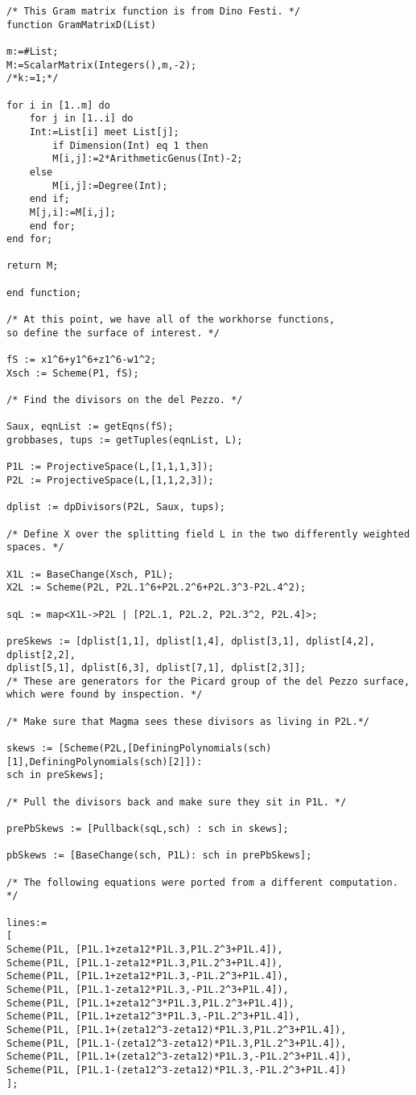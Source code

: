\documentclass[12pt,twoside]{reedthesis}
\theoremstyle{plain}
\theoremstyle{definition}
\theoremstyle{remark}
\begin{document}
\begin{appendices}
\begin{verbatim}
/* This Gram matrix function is from Dino Festi. */
function GramMatrixD(List)

m:=#List;
M:=ScalarMatrix(Integers(),m,-2);
/*k:=1;*/

for i in [1..m] do
    for j in [1..i] do
	Int:=List[i] meet List[j];
        if Dimension(Int) eq 1 then
	    M[i,j]:=2*ArithmeticGenus(Int)-2;
	else
	    M[i,j]:=Degree(Int);
	end if;
	M[j,i]:=M[i,j];
    end for;
end for;

return M;

end function;

/* At this point, we have all of the workhorse functions, 
so define the surface of interest. */

fS := x1^6+y1^6+z1^6-w1^2;
Xsch := Scheme(P1, fS);

/* Find the divisors on the del Pezzo. */

Saux, eqnList := getEqns(fS);
grobbases, tups := getTuples(eqnList, L);

P1L := ProjectiveSpace(L,[1,1,1,3]);
P2L := ProjectiveSpace(L,[1,1,2,3]);

dplist := dpDivisors(P2L, Saux, tups);

/* Define X over the splitting field L in the two differently weighted spaces. */

X1L := BaseChange(Xsch, P1L);
X2L := Scheme(P2L, P2L.1^6+P2L.2^6+P2L.3^3-P2L.4^2);

sqL := map<X1L->P2L | [P2L.1, P2L.2, P2L.3^2, P2L.4]>;

preSkews := [dplist[1,1], dplist[1,4], dplist[3,1], dplist[4,2], dplist[2,2], 
dplist[5,1], dplist[6,3], dplist[7,1], dplist[2,3]]; 
/* These are generators for the Picard group of the del Pezzo surface, 
which were found by inspection. */

/* Make sure that Magma sees these divisors as living in P2L.*/

skews := [Scheme(P2L,[DefiningPolynomials(sch)[1],DefiningPolynomials(sch)[2]]): 
sch in preSkews];

/* Pull the divisors back and make sure they sit in P1L. */

prePbSkews := [Pullback(sqL,sch) : sch in skews];

pbSkews := [BaseChange(sch, P1L): sch in prePbSkews];

/* The following equations were ported from a different computation. */

lines:=
[
Scheme(P1L, [P1L.1+zeta12*P1L.3,P1L.2^3+P1L.4]),
Scheme(P1L, [P1L.1-zeta12*P1L.3,P1L.2^3+P1L.4]),
Scheme(P1L, [P1L.1+zeta12*P1L.3,-P1L.2^3+P1L.4]),
Scheme(P1L, [P1L.1-zeta12*P1L.3,-P1L.2^3+P1L.4]),
Scheme(P1L, [P1L.1+zeta12^3*P1L.3,P1L.2^3+P1L.4]),
Scheme(P1L, [P1L.1+zeta12^3*P1L.3,-P1L.2^3+P1L.4]),
Scheme(P1L, [P1L.1+(zeta12^3-zeta12)*P1L.3,P1L.2^3+P1L.4]),
Scheme(P1L, [P1L.1-(zeta12^3-zeta12)*P1L.3,P1L.2^3+P1L.4]),
Scheme(P1L, [P1L.1+(zeta12^3-zeta12)*P1L.3,-P1L.2^3+P1L.4]),
Scheme(P1L, [P1L.1-(zeta12^3-zeta12)*P1L.3,-P1L.2^3+P1L.4])
];


\end{verbatim}
\end{appendices}
\end{document}
